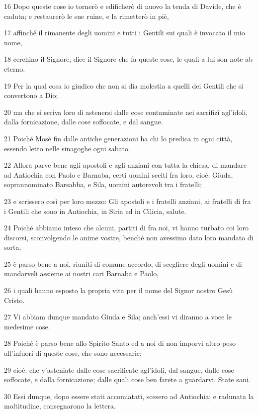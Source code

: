 \par 16 Dopo queste cose io tornerò e edificherò di nuovo la tenda di Davide, che è caduta; e restaurerò le sue ruine, e la rimetterò in piè,
\par 17 affinché il rimanente degli uomini e tutti i Gentili sui quali è invocato il mio nome,
\par 18 cerchino il Signore, dice il Signore che fa queste cose, le quali a lui son note ab eterno.
\par 19 Per la qual cosa io giudico che non si dia molestia a quelli dei Gentili che si convertono a Dio;
\par 20 ma che si scriva loro di astenersi dalle cose contaminate nei sacrifizî agl'idoli, dalla fornicazione, dalle cose soffocate, e dal sangue.
\par 21 Poiché Mosè fin dalle antiche generazioni ha chi lo predica in ogni città, essendo letto nelle sinagoghe ogni sabato.
\par 22 Allora parve bene agli apostoli e agli anziani con tutta la chiesa, di mandare ad Antiochia con Paolo e Barnaba, certi uomini scelti fra loro, cioè: Giuda, soprannominato Barsabba, e Sila, uomini autorevoli tra i fratelli;
\par 23 e scrissero così per loro mezzo: Gli apostoli e i fratelli anziani, ai fratelli di fra i Gentili che sono in Antiochia, in Siria ed in Cilicia, salute.
\par 24 Poiché abbiamo inteso che alcuni, partiti di fra noi, vi hanno turbato coi loro discorsi, sconvolgendo le anime vostre, benché non avessimo dato loro mandato di sorta,
\par 25 è parso bene a noi, riuniti di comune accordo, di scegliere degli uomini e di mandarveli assieme ai nostri cari Barnaba e Paolo,
\par 26 i quali hanno esposto la propria vita per il nome del Signor nostro Gesù Cristo.
\par 27 Vi abbiam dunque mandato Giuda e Sila; anch'essi vi diranno a voce le medesime cose.
\par 28 Poiché è parso bene allo Spirito Santo ed a noi di non imporvi altro peso all'infuori di queste cose, che sono necessarie;
\par 29 cioè: che v'asteniate dalle cose sacrificate agl'idoli, dal sangue, dalle cose soffocate, e dalla fornicazione; dalle quali cose ben farete a guardarvi. State sani.
\par 30 Essi dunque, dopo essere stati accomiatati, scesero ad Antiochia; e radunata la moltitudine, consegnarono la lettera.
